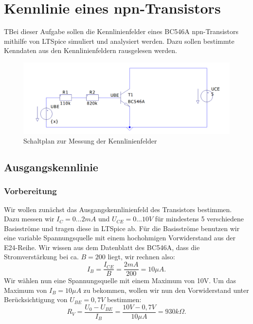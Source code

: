 \documentclass{article}
\begin{document}
\tableofcontents


\newpage


\section{Kennlinie eines npn-Transistors}
\begin{task}
  TBei dieser Aufgabe sollen die Kennlinienfelder eines BC546A npn-Transistors mithilfe von LTSpice simuliert und analysiert werden. Dazu sollen bestimmte Kenndaten aus den Kennlinienfeldern rausgelesen werden.
\end{task}

\begin{figure}[h]
  \centering
  \includegraphics[scale=0.76]{../assets/images/EL1P3/Schaltplan1.png}
  \caption{Schaltplan zur Messung der Kennlinienfelder}
  \label{fig:schalt1}
\end{figure}

\subsection{Ausgangskennlinie}
\label{sec:ausgangskennlinie}

\subsubsection{Vorbereitung}


Wir wollen zunächst das Ausgangskennlinienfeld des Transistors bestimmen. Dazu messen wir $I_{C} = 0...2mA$ und $U_{CE} = 0...10V$ für mindestens 5 verschiedene Basisströme und tragen diese
in LTSpice ab. Für die Basisströme benutzen wir eine variable Spannungsquelle mit einem hochohmigen Vorwiderstand aus der E24-Reihe. Wir wissen aus dem Datenblatt des BC546A, dass die Stromverstärkung bei ca. $B=200$ liegt, wir rechnen also:
\begin{equation}
  \label{eq:1}
  I_{B} = \frac{I_{CE}}{B} = \frac{2mA}{200} = 10\mu A.
\end{equation}
Wir wählen nun eine Spannungsquelle mit einem Maximum von 10V. Um das Maximum von $I_{B} = 10\mu A$ zu bekommen, wollen wir nun den Vorwiderstand unter Berücksichtigung von $U_{BE} = 0,7V$ bestimmen:
\begin{equation}
  \label{eq:2}
  R_{V} = \frac{U_{0}-U_{BE}}{I_{B}} = \frac{10V-0,7V}{10\mu A} = 930k\Omega.
\end{equation}
\end{document}
